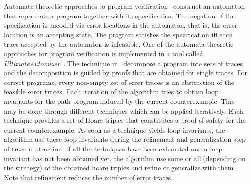 %
%
Automata-theoretic approaches to program verification~\cite{DBLP:conf/cav/KupfermanV00,
DBLP:books/sp/cstoday95/Vardi95,DBLP:conf/cav/HeizmannHP13} construct 
an automaton that represents a program together with its specification.
The negation of the specification is encoded via error locations in the automaton, 
that is, the error location is an accepting state.  The program satisfies the 
specification iff each trace accepted by the automaton is infeasible.
%
One of the automata-theoretic approaches for program verification 
is implemented in a tool called 
\textit{UltimateAutomizer}~\cite{DBLP:conf/tacas/HeizmannDGLMSP16}. 
The technique in~\cite{DBLP:conf/tacas/HeizmannDGLMSP16} decompose a 
program into sets of traces, and the decomposition is guided by proofs that 
are obtained for single traces. For correct programs, every non-empty set 
of error traces is an abstraction of the feasible error traces.  
Each iteration of the algorithm tries to obtain loop invariants for the path program
induced by the current counterexample.  This may be done through different techniques 
which can be applied iteratively. Each technique provides a set of Hoare triples that constitutes a proof of
safety for the current counterexample.
As soon as a technique yields loop invariants, the algorithm use these loop
invariants during the refinement and generalization step of trace abstraction.  If all the 
techniques have been exhausted and a loop invariant has not been obtained yet, the algorithm
use some or all (depending on the strategy) of the obtained hoare triples and 
refine or generalize with them.  Note that refinement reduces the number of error traces. 
